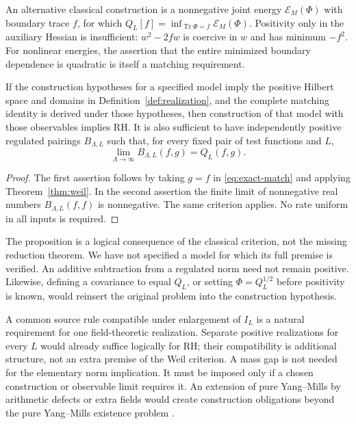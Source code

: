 An alternative classical construction is a nonnegative joint energy
$\mathcal E_M(\Phi)$ with boundary trace $f$, for which
$Q_L[f]=\inf_{\operatorname{Tr}\Phi=f}\mathcal E_M(\Phi)$.
Positivity only in the auxiliary Hessian is insufficient:
$w^2-2fw$ is coercive in $w$ and has minimum $-f^2$.
For nonlinear energies, the assertion that the entire minimized
boundary dependence is quadratic is itself a matching requirement.

\begin{proposition}
\label{prop:conditional}
If the construction hypotheses for a specified model imply the positive
Hilbert space and domains in Definition~\ref{def:realization}, and the
complete matching identity is derived under those hypotheses, then
construction of that model with those observables implies RH.
It is also sufficient to have independently positive regulated pairings
$B_{\Lambda,L}$ such that, for every fixed pair of test functions and $L$,
\begin{equation}\label{eq:regulated-limit}
 \lim_{\Lambda\to\infty}B_{\Lambda,L}(f,g)=Q_L(f,g).
\end{equation}
\end{proposition}
\begin{proof}
The first assertion follows by taking $g=f$ in \eqref{eq:exact-match}
and applying Theorem~\ref{thm:weil}. In the second assertion the finite
limit of nonnegative real numbers $B_{\Lambda,L}(f,f)$ is nonnegative.
The same criterion applies. No rate uniform in all inputs is required.
\end{proof}

The proposition is a logical consequence of the classical criterion,
not the missing reduction theorem. We have not specified a model for
which its full premise is verified. An additive subtraction from a
regulated norm need not remain positive. Likewise, defining a covariance
to equal $Q_L$, or setting $\Phi=Q_L^{1/2}$ before positivity is known,
would reinsert the original problem into the construction hypothesis.

A common source rule compatible under enlargement of $I_L$ is a natural
requirement for one field-theoretic realization. Separate positive
realizations for every $L$ would already suffice logically for RH; their
compatibility is additional structure, not an extra premise of the Weil
criterion. A mass gap is not needed for the elementary norm implication.
It must be imposed only if a chosen construction or observable limit
requires it. An extension of pure Yang--Mills by arithmetic defects or
extra fields would create construction obligations beyond the pure
Yang--Mills existence problem \cite{ClayYM}.

